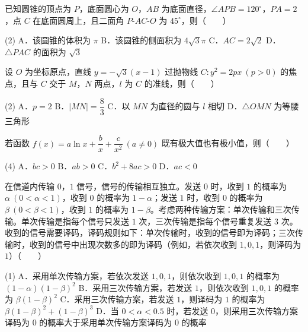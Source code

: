 \begin{question}
已知圆锥的顶点为 $P$，底面圆心为 $O$，$AB$ 为底面直径，$\angle APB=120^\circ$，$PA=2$，点 $C$ 在底面圆周上，且二面角 $P\text{-}AC\text{-}O$ 为 $45^\circ$，则\mbox{（　　）}

\begin{gkopts}(2)
\task A．该圆锥的体积为 $\pi$
\task B．该圆锥的侧面积为 $4\sqrt3\pi$
\task C．$AC=2\sqrt2$
\task D．$\triangle PAC$ 的面积为 $\sqrt3$
\end{gkopts}

\end{question}
\begin{question}
设 $O$ 为坐标原点，直线 $y=-\sqrt3(x-1)$ 过抛物线 $C:y^{2}=2px\ (p>0)$ 的焦点，且与 $C$ 交于 $M$，$N$ 两点，$l$ 为 $C$ 的准线，则\mbox{（　　）}

\begin{gkopts}(2)
\task A．$p=2$
\task B．$|MN|=\dfrac83$
\task C．以 $MN$ 为直径的圆与 $l$ 相切
\task D．$\triangle OMN$ 为等腰三角形
\end{gkopts}

\end{question}
\begin{question}
若函数 $f(x)=a\ln x+\dfrac bx+\dfrac c{x^{2}}\ (a\ne0)$ 既有极大值也有极小值，则\mbox{（　　）}

\begin{gkopts}(4)
\task A．$bc>0$
\task B．$ab>0$
\task C．$b^{2}+8ac>0$
\task D．$ac<0$
\end{gkopts}

\end{question}
\begin{question}
在信道内传输 $0$，$1$ 信号，信号的传输相互独立。发送 $0$ 时，收到 $1$ 的概率为 $\alpha\ (0<\alpha<1)$，收到 $0$ 的概率为 $1-\alpha$；发送 $1$ 时，收到 $0$ 的概率为 $\beta\ (0<\beta<1)$，收到 $1$ 的概率为 $1-\beta$。考虑两种传输方案：单次传输和三次传输。单次传输是指每个信号只发送 $1$ 次，三次传输是指每个信号重复发送 $3$ 次。收到的信号需要译码，译码规则如下：单次传输时，收到的信号即为译码；三次传输时，收到的信号中出现次数多的即为译码（例如，若依次收到 $1,0,1$，则译码为 $1$）\mbox{（　　）}

\begin{gkopts}(1)
\task A．采用单次传输方案，若依次发送 $1,0,1$，则依次收到 $1,0,1$ 的概率为 $(1-\alpha)(1-\beta)^{2}$
\task B．采用三次传输方案，若发送 $1$，则依次收到 $1,0,1$ 的概率为 $\beta(1-\beta)^{2}$
\task C．采用三次传输方案，若发送 $1$，则译码为 $1$ 的概率为 $\beta(1-\beta)^{2}+(1-\beta)^{3}$
\task D．当 $0<\alpha<0.5$ 时，若发送 $0$，则采用三次传输方案译码为 $0$ 的概率大于采用单次传输方案译码为 $0$ 的概率
\end{gkopts}

\par\medskip

\end{question}

